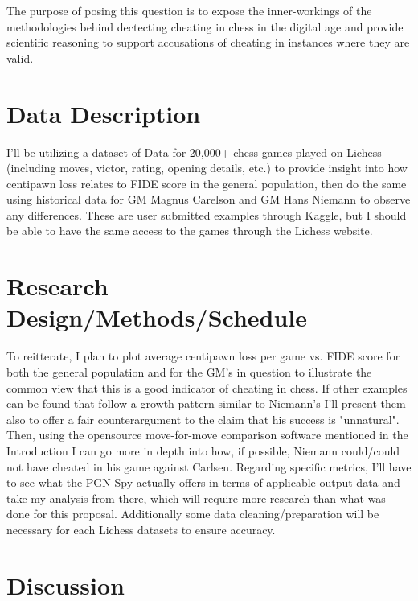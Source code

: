 \documentclass[12pt]{article}
\begin{document}
The purpose of posing this question is to expose the inner-workings of the methodologies behind dectecting 
cheating in chess in the digital age and provide scientific reasoning to support accusations of cheating in 
instances where they are valid.

\section*{Data Description}
\label{sec:data}

I'll be utilizing a dataset of Data for 20,000+ chess games played on Lichess \citep{mysarahmadbhat2021} 
(including moves, victor, rating, opening details, etc.) to provide insight into how centipawn loss relates 
to FIDE score in the general population, then do the same using historical data for GM Magnus Carelson 
\citep{zaidqureshi2022carlsen} and GM Hans Niemann \citep{zaidqureshi2022niemann} to observe any differences. These are user 
submitted examples through Kaggle, but I should be able to have the same access to the games through the Lichess website.

\section*{Research Design/Methods/Schedule}
\label{sec:res}

To reitterate, I plan to plot average centipawn loss per game vs. FIDE score for both the general population 
and for the GM's in question to illustrate the common view that this is a good indicator of cheating in chess. If 
other examples can be found that follow a growth pattern similar to Niemann's I'll present them also to offer a 
fair counterargument to the claim that his success is "unnatural". Then, using the opensource move-for-move comparison 
software mentioned in the Introduction I can go more in depth into how, if possible, Niemann could/could not have 
cheated in his game against Carlsen. Regarding specific metrics, I'll have to see what the PGN-Spy actually offers in 
terms of applicable output data and take my analysis from there, which will require more research than what was done 
for this proposal. Additionally some data cleaning/preparation will be necessary for each Lichess datasets to ensure 
accuracy.

\section*{Discussion}
\label{sec:disc}
\end{document}
